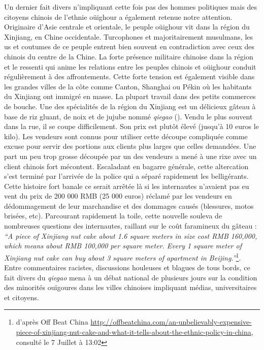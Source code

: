 Un dernier fait divers n'impliquant cette fois pas des hommes politiques mais des citoyens chinois de l'ethnie oüighour a également retenue notre attention. Originaire d'Asie centrale et orientale, le peuple oüighour vit dans la région du Xinjiang, en Chine occidentale. Turcophones et majoritairement musulmans, les us et coutumes de ce peuple entrent bien souvent en contradiction avec ceux des chinois du centre de la Chine. La forte présence militaire chinoise dans la région et le ressenti qui anime les relations entre les peuples chinois et oüighour conduit régulièrement à des affrontements. Cette forte tension est également visible dans les grandes villes de la côte comme Canton, Shanghai ou Pékin où les habitants du Xinjiang ont immigré en masse. La plupart travail dans des petits commerces de bouche. Une des spécialités de la région du Xinjiang est un délicieux gâteau à base de riz gluant, de noix et de jujube nommé \textit{qiegao} (). Vendu le plus souvent dans la rue, il se coupe difficilement. Son prix est plutôt élevé (jusqu'à 10 euros le kilo). Les vendeurs sont connus pour utiliser cette découpe compliquée comme excuse pour servir des portions aux clients plus larges que celles demandées. Une part un peu trop grosse découpée par un des vendeurs a mené à une rixe avec un client chinois fort mécontent. Escaladant en bagarre générale, cette altercation s'est terminé par l'arrivée de la police qui a séparé rapidement les belligérants. Cette histoire fort banale ce serait arrêtée là si les internautes n'avaient pas eu vent du prix de 200 000 RMB (25 000 euros) réclamé par les vendeurs en dédommagement de leur marchandise et des dommages causés (blessures, motos brisées, etc). Parcourant rapidement la toile, cette nouvelle souleva de nombreuses questions des internautes, raillant sur le coût faramineux du gâteau : \textit{``A piece of Xinjiang nut cake about 1.6 square meters in size cost RMB 160,000, which means about RMB 100,000 per square meter. Every 1 square meter of Xinjiang nut cake can buy about 3 square meters of apartment in Beijing.''}\footnote{d'après Off Beat China \url{http://offbeatchina.com/an-unbelievably-expensive-piece-of-xinjiang-nut-cake-and-what-it-tells-about-the-ethnic-policy-in-china}, consulté le 7 Juillet à 13:02}. Entre commentaires racistes, discussions houleuses et blagues de tous bords, ce fait divers du \textit{qiegao} mena à un débat national de plusieurs jours sur la condition des minorités ouïgoures dans les villes chinoises impliquant médias, universitaires et citoyens. 

